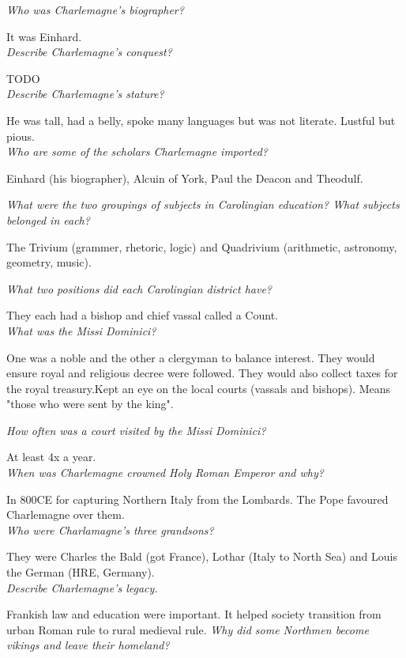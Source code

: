 \documentclass[12pt]{article}
\begin{document}
\textit{Who was Charlemagne's biographer?}

It was Einhard.\\

\textit{Describe Charlemagne's conquest?}

TODO\\

\textit{Describe Charlemagne's stature?}

He was tall, had a belly, spoke many languages but was not literate. Lustful but pious.\\

\textit{Who are some of the scholars Charlemagne imported?}

Einhard (his biographer), Alcuin of York, Paul the Deacon and Theodulf.

\textit{What were the two groupings of subjects in Carolingian education? What subjects belonged in each?}

The Trivium (grammer, rhetoric, logic) and Quadrivium (arithmetic, astronomy, geometry, music).

\textit{What two positions did each Carolingian district have?}

They each had a bishop and chief vassal called a Count.\\

\textit{What was the Missi Dominici?}

One was a noble and the other a clergyman to balance interest. They would ensure royal and religious decree were followed. They would also collect taxes for the royal treasury.Kept an eye on the local courts (vassals and bishops).
Means "those who were sent by the king". 

\textit{How often was a court visited by the Missi Dominici?}

At least 4x a year.\\

\textit{When was Charlemagne crowned Holy Roman Emperor and why?}

In 800CE for capturing Northern Italy from the Lombards. The Pope favoured Charlemagne over them.\\

\textit{Who were Charlamagne's three grandsons?}

They were Charles the Bald (got France), Lothar (Italy to North Sea) and Louis the German (HRE, Germany).\\


\textit{Describe Charlemagne's legacy.}

Frankish law and education were important. It helped society transition from urban Roman rule to rural medieval rule.
\textit{Why did some Northmen become vikings and leave their homeland?}
\end{document}
